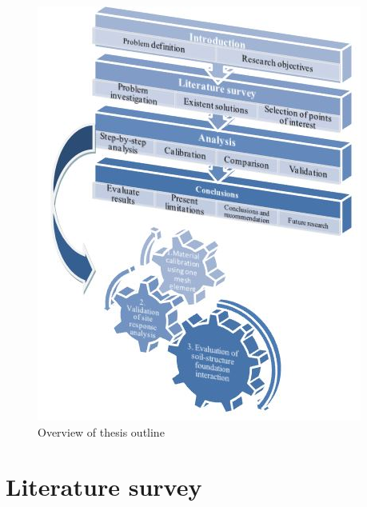 \documentclass[10pt,a4paper]{report}
\begin{document}
\begin{figure}[h!]
	\centering
	\includegraphics[width=1\linewidth]{"outline"}
	\caption{Overview of thesis outline}
	\label{outline}
\end{figure}

\chapter{Literature survey}
\end{document}
